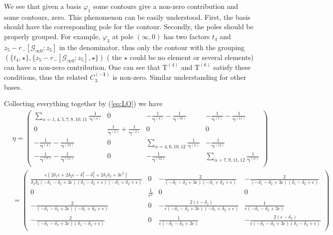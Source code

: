 \documentclass[a4paper,11pt]{article}
\newcommand{\nn}{\nonumber}
\newcommand{\nT}{\mathrm{T}}
\newcommand{\mG}{\mathcal{G}}
\def\eref#1{(\ref{#1})}
\begin{document}
We see that given a basis $\varphi_{1}$ some contours give a non-zero contribution and some contours,  zero.
This phenomenon can be easily understood.  First, the basis should have the corresponding pole for the contour.
Secondly, the poles should be properly grouped. For example, $\varphi_3$ at pole $(\infty,0)$ has two factors  $t_4$ and $z_5-r_-[\mG_{\infty0};z_5]$ in the denominator, thus only the contour with the grouping 
$(\{t_4,\star\},\{z_5-r_-[\mG_{\infty0};z_5],\star\})$ ( the $\star$ could be no element or several elements)
can have a non-zero contribution. One can see that $\nT^{(4)}$ and $\nT^{(6)}$ satisfy these conditions, thus the related $C^{(\bm{-1})}_3$ is non-zero.
Similar understanding for other bases.


Collecting everything together by \eref{eq:LO} we have
\begin{align} 
&\eta=\left(
\begin{array}{cccc}
 \sum_{\alpha=1,4,5,7,8,10,11}\frac{1}{\bm{\gamma}^{(\alpha)}} & 0 & -\frac{1}{\bm{\gamma}^{(4)}}-\frac{1}{\bm{\gamma}^{(10)}} & -\frac{1}{\bm{\gamma}^{(7)}}-\frac{1}{\bm{\gamma}^{(11)}} \\
 0 & \frac{1}{\bm{\gamma}^{(2)}}+\frac{1}{\bm{\gamma}^{(3)}} & 0 & 0 \\
 -\frac{1}{\bm{\gamma}^{(4)}}-\frac{1}{\bm{\gamma}^{(10)}} & 0 &  \sum_{\alpha=4,6,10,12}\frac{1}{\bm{\gamma}^{(\alpha)}} & -\frac{1}{\bm{\gamma}^{(12)}} \\
 -\frac{1}{\bm{\gamma}^{(7)}}-\frac{1}{\bm{\gamma}^{(11)}} & 0 & -\frac{1}{\bm{\gamma}^{(12)}}  &  \sum_{\alpha=7,9,11,12}\frac{1}{\bm{\gamma}^{(\alpha)}} \\
\end{array}
\right) \nn\\
&=\left(
\begin{array}{cccc}
 \frac{\epsilon  \left(2 \delta _1 \epsilon +2 \delta _2 \epsilon -\delta _1^2-\delta _2^2+2
   \delta _1 \delta _2+3 \epsilon ^2\right)}{\delta _1 \delta _2 \left(-\delta _1-\delta _2+3
   \epsilon \right) \left(\delta _1-\delta _2+\epsilon \right) \left(-\delta _1+\delta
   _2+\epsilon \right)} & 0 & -\frac{2}{\left(-\delta _1-\delta _2+3 \epsilon \right)
   \left(-\delta _1+\delta _2+\epsilon \right)} & -\frac{2}{\left(-\delta _1-\delta _2+3
   \epsilon \right) \left(\delta _1-\delta _2+\epsilon \right)} \\
 0 & \frac{1}{\epsilon ^2} & 0 & 0 \\
 -\frac{2}{\left(-\delta _1-\delta _2+3 \epsilon \right) \left(-\delta _1+\delta _2+\epsilon
   \right)} & 0 & -\frac{2 \left(\epsilon -\delta _1\right)}{\epsilon  \left(-\delta _1-\delta
   _2+3 \epsilon \right) \left(-\delta _1+\delta _2+\epsilon \right)} & \frac{1}{\epsilon 
   \left(-\delta _1-\delta _2+3 \epsilon \right)} \\
 -\frac{2}{\left(-\delta _1-\delta _2+3 \epsilon \right) \left(\delta _1-\delta _2+\epsilon
   \right)} & 0 & \frac{1}{\epsilon  \left(-\delta _1-\delta _2+3 \epsilon \right)} & -\frac{2
   \left(\epsilon -\delta _2\right)}{\epsilon  \left(-\delta _1-\delta _2+3 \epsilon \right)
   \left(\delta _1-\delta _2+\epsilon \right)} \\
\end{array}
\right)~~~\label{5.20}
\end{align}
\end{document}

